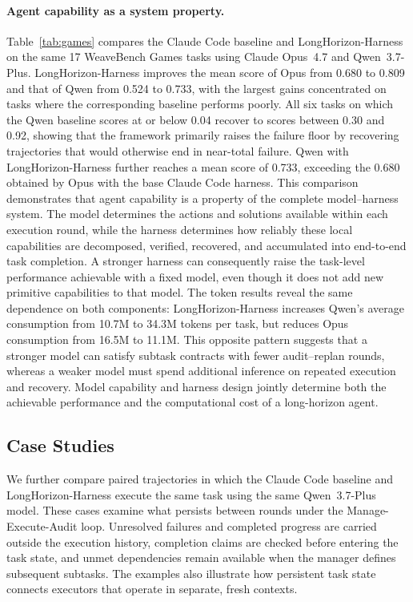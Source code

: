 \paragraph{Agent capability as a system property.}
Table~\ref{tab:games} compares the Claude Code baseline and LongHorizon-Harness on the same 17 WeaveBench Games tasks using Claude Opus~4.7 and Qwen~3.7-Plus. LongHorizon-Harness improves the mean score of Opus from 0.680 to 0.809 and that of Qwen from 0.524 to 0.733, with the largest gains concentrated on tasks where the corresponding baseline performs poorly. All six tasks on which the Qwen baseline scores at or below 0.04 recover to scores between 0.30 and 0.92, showing that the framework primarily raises the failure floor by recovering trajectories that would otherwise end in near-total failure. Qwen with LongHorizon-Harness further reaches a mean score of 0.733, exceeding the 0.680 obtained by Opus with the base Claude Code harness. This comparison demonstrates that agent capability is a property of the complete model--harness system. The model determines the actions and solutions available within each execution round, while the harness determines how reliably these local capabilities are decomposed, verified, recovered, and accumulated into end-to-end task completion. A stronger harness can consequently raise the task-level performance achievable with a fixed model, even though it does not add new primitive capabilities to that model. The token results reveal the same dependence on both components: LongHorizon-Harness increases Qwen's average consumption from 10.7M to 34.3M tokens per task, but reduces Opus consumption from 16.5M to 11.1M. This opposite pattern suggests that a stronger model can satisfy subtask contracts with fewer audit--replan rounds, whereas a weaker model must spend additional inference on repeated execution and recovery. Model capability and harness design jointly determine both the achievable performance and the computational cost of a long-horizon agent.


\subsection{Case Studies}
\label{sec:case-studies}

We further compare paired trajectories in which the Claude Code
baseline and LongHorizon-Harness execute the same task using the same
Qwen~3.7-Plus model. These cases examine what persists between rounds
under the Manage-Execute-Audit loop. Unresolved failures and completed
progress are carried outside the execution history, completion claims
are checked before entering the task state, and unmet dependencies
remain available when the manager defines subsequent subtasks. The
examples also illustrate how persistent task state connects executors
that operate in separate, fresh contexts.


